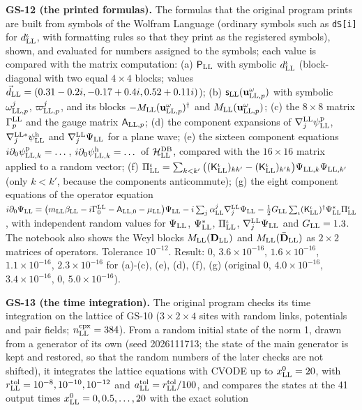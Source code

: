 \documentclass[
  10pt,
]{article}
\begin{document}
\textbf{GS-12 (the printed formulas).} The formulas that the original
program prints are built from symbols of the Wolfram Language (ordinary
symbols such as \texttt{dS{[}i{]}} for \(d^\iota_{\rm LL}\), with
formatting rules so that they print as the registered symbols), shown,
and evaluated for numbers assigned to the symbols; each value is
compared with the matrix computation: (a) \(\mathsf P_{\rm LL}\) with
symbolic \(d^\iota_{\rm LL}\) (block-diagonal with two equal
\(4\times4\) blocks; values
\(\vec d_{\rm LL}=(0.31-0.2i,-0.17+0.4i,0.52+0.11i)\)); (b)
\(\mathsf s_{\rm LL}(\mathbf u^\omega_{{\rm LL},p})\) with symbolic
\(\omega^j_{{\rm LL},p}\), \(\varpi^j_{{\rm LL},p}\), and its blocks
\(-M_{\rm LL}(\mathbf u^\omega_{{\rm LL},p})^\dagger\) and
\(M_{\rm LL}(\mathbf u^\omega_{{\rm LL},p})\); (c) the \(8\times8\)
matrix \(\Gamma^{\rm LL}_p\) and the gauge matrix
\(\mathsf A_{{\rm LL},p}\); (d) the component expansions of
\(\nabla^{\rm LL}_j\psi^{\rm p}_{\rm LL}\),
\(\nabla^{{\rm LL}*}_j\psi^{\rm h}_{\rm LL}\) and
\(\nabla^{\rm LL}_j\Psi_{\rm LL}\) for a plane wave; (e) the sixteen
component equations \(i\partial_0\psi^{\rm p}_{{\rm LL},k}=\dots\),
\(i\partial_0\psi^{\rm h}_{{\rm LL},k}=\dots\) of
\(\mathcal H^{\rm DB}_{\rm LL}\), compared with the \(16\times16\)
matrix applied to a random vector; (f)
\(\Pi^\iota_{\rm LL}=\sum_{k<k'}\big((\mathsf K^\iota_{\rm LL})_{kk'}-(\mathsf K^\iota_{\rm LL})_{k'k}\big)\Psi_{{\rm LL},k}\Psi_{{\rm LL},k'}\)
(only \(k<k'\), because the components anticommute); (g) the eight
component equations of the operator equation
\(i\partial_0\Psi_{\rm LL}=\big(m_{\rm LL}\beta_{\rm LL}-i\Gamma^{\rm LL}_0-\mathsf A_{{\rm LL},0}-\mu_{\rm LL}\big)\Psi_{\rm LL}-i\sum_j\alpha^j_{\rm LL}\nabla^{\rm LL}_j\Psi_{\rm LL}-\tfrac12G_{\rm LL}\sum_\iota(\mathsf K^\iota_{\rm LL})^\dagger\Psi^*_{\rm LL}\Pi^\iota_{\rm LL}\),
with independent random values for \(\Psi_{\rm LL}\),
\(\Psi^*_{\rm LL}\), \(\Pi^\iota_{\rm LL}\),
\(\nabla^{\rm LL}_j\Psi_{\rm LL}\) and \(G_{\rm LL}=1.3\). The notebook
also shows the Weyl blocks \(M_{\rm LL}(\mathbf D_{\rm LL})\) and
\(M_{\rm LL}(\bar{\mathbf D}_{\rm LL})\) as \(2\times2\) matrices of
operators. Tolerance \(10^{-12}\). Result: 0, \(3.6\times10^{-16}\),
\(1.6\times10^{-16}\), \(1.1\times10^{-16}\), \(2.3\times10^{-16}\) for
(a)-(c), (e), (d), (f), (g) (original 0, \(4.0\times10^{-16}\),
\(3.4\times10^{-16}\), 0, \(5.0\times10^{-16}\)).

\textbf{GS-13 (the time integration).} The original program checks its
time integration on the lattice of GS-10 (\(3\times2\times4\) sites with
random links, potentials and pair fields; \(n^{\rm cpx}_{\rm LL}=384\)).
From a random initial state of the norm 1, drawn from a generator of its
own (seed 2026111713; the state of the main generator is kept and
restored, so that the random numbers of the later checks are not
shifted), it integrates the lattice equations with CVODE up to
\(x^0_{\rm LL}=20\), with
\(r^{\rm tol}_{\rm LL}=10^{-8},10^{-10},10^{-12}\) and
\(a^{\rm tol}_{\rm LL}=r^{\rm tol}_{\rm LL}/100\), and compares the
states at the 41 output times \(x^0_{\rm LL}=0,0.5,\dots,20\) with the
exact solution
\end{document}
